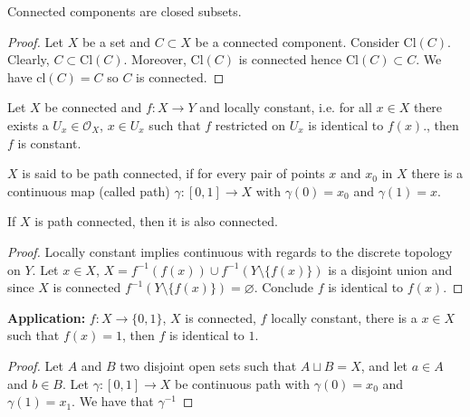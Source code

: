 %
\begin{thmbox}
    \begin{proposition}
        Connected components are closed subsets.
    \end{proposition}
\end{thmbox}
%
\begin{proof}
    Let \(X\) be a set and \(C \subset X\) be a connected component. Consider \(\mathrm{Cl}(C)\). Clearly, \(C \subset \mathrm{Cl}(C)\). Moreover, \(\mathrm{Cl}(C)\) is connected hence \(\mathrm{Cl}(C) \subset C\). We have \(\mathrm{cl}(C) = C\) so \(C\) is connected.
\end{proof}
%
\begin{thmbox}
    \begin{lemma}
        Let \(X\) be connected and \(f: X \longrightarrow Y\) and locally constant, i.e. for all \(x \in X\) there exists a \(U_x \in \mathcal{O}_X\), \(x \in U_x\) such that \(f\) restricted on \(U_x\) is identical to \(f(x)\)., then \(f\) is constant.
    \end{lemma}
\end{thmbox}
%
\begin{defbox}
    \begin{definition}
        \(X\) is said to be {\color{maththen}path connected}, if for every pair of points \(x\) and \(x_0\) in \(X\) there is a continuous map (called path) \(\gamma: [0, 1] \longrightarrow X\) with \(\gamma(0) = x_0\) and \(\gamma(1) = x\).
    \end{definition}
\end{defbox}
%
\begin{thmbox}
    \begin{lemma}
        If \(X\) is path connected, then it is also connected.
    \end{lemma}
\end{thmbox}
%
\begin{proof}
    Locally constant implies continuous with regards to the discrete topology on \(Y\). Let \(x \in X\), \(X = f^{-1}(f(x)) \cup f^{-1}(Y \setminus \{f(x)\})\) is a disjoint union and since \(X\) is connected \(f^{-1}(Y \setminus \{f(x)\}) = \varnothing\). Conclude \(f\) is identical to \(f(x)\).
\end{proof}

\textbf{Application:} \(f: X \longrightarrow \{0, 1\}\), \(X\) is connected, \(f\) locally constant, there is a \(x \in X\) such that \(f(x) = 1\), then \(f\) is identical to \(1\).

\begin{proof}
    Let \(A\) and \(B\) two disjoint open sets such that \(A \sqcup B = X\), and let \(a \in A\) and \(b \in B\). Let \(\gamma: [0, 1] \longrightarrow X\) be continuous path with \(\gamma(0) = x_0\) and \(\gamma(1) = x_1\). We have that \(\gamma^{-1}\)
\end{proof}

